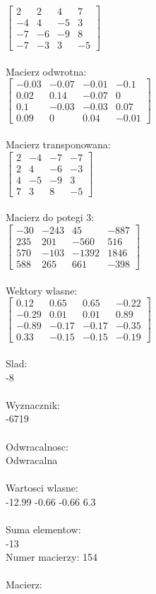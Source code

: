 \documentclass[a4paper,12pt]{article}
\begin{document}
$\begin{bmatrix} 2&2&4&7\\-4&4&-5&3\\-7&-6&-9&8\\-7&-3&3&-5 \end{bmatrix}$
\\
\\
Macierz odwrotna:\\

$\begin{bmatrix} -0.03&-0.07&-0.01&-0.1\\0.02&0.14&-0.07&0\\0.1&-0.03&-0.03&0.07\\0.09&0&0.04&-0.01 \end{bmatrix}$
\\
\\
Macierz transponowana:\\

$\begin{bmatrix} 2&-4&-7&-7\\2&4&-6&-3\\4&-5&-9&3\\7&3&8&-5 \end{bmatrix}$
\\
\\
Macierz do potegi 3:\\

$\begin{bmatrix} -30&-243&45&-887\\235&201&-560&516\\570&-103&-1392&1846\\588&265&661&-398 \end{bmatrix}$
\\
\\
Wektory wlasne:\\

$\begin{bmatrix} 0.12&0.65&0.65&-0.22\\-0.29&0.01&0.01&0.89\\-0.89&-0.17&-0.17&-0.35\\0.33&-0.15&-0.15&-0.19 \end{bmatrix}$
\\
\\
Slad:\\
-8
\\
\\
Wyznacznik:\\
-6719
\\
\\
Odwracalnosc:\\
Odwracalna
\\
\\
Wartosci wlasne:\\
-12.99 -0.66 -0.66 6.3
\\
\\
Suma elementow:\\
-13
\\
\newpage
Numer macierzy:
154
\\
\\
Macierz:\\
\end{document}
